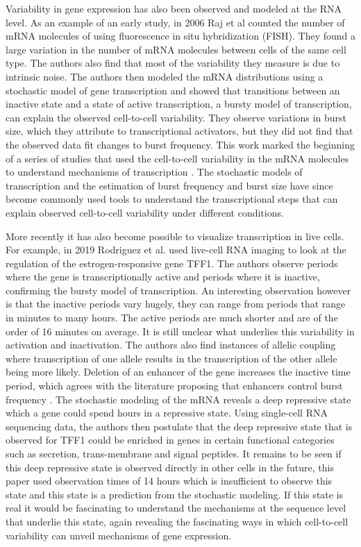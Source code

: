 Variability in gene expression has also been observed and modeled at the RNA level. As an example of an early study, in 2006 Raj et al \cite{raj2006pb} counted the number of mRNA molecules of using fluorescence in situ hybridization (FISH). They found a large variation in the number of mRNA molecules between cells of the same cell type. The authors also find that most of the variability they measure is due to intrinsic noise. The authors then modeled the mRNA distributions using a stochastic model of gene transcription and showed that transitions between an inactive state and a state of active transcription, a bursty model of transcription, can explain the observed cell-to-cell variability. They observe variations in burst size, which they attribute to transcriptional activators, but they did not find that the observed data fit changes to burst frequency. This work marked the beginning of a series of studies that used the cell-to-cell variability in the mRNA molecules to understand mechanisms of transcription \cite{symmons2016mc} \cite{chen2018tissues}. The stochastic models of transcription and the estimation of burst frequency and burst size have since become commonly used tools to understand the transcriptional steps that can explain observed cell-to-cell variability under different conditions.

More recently it has also become possible to visualize transcription in live cells. For example, in 2019 Rodriguez et al. \cite{rodriguez_intrinsic_2019} used live-cell RNA imaging to look at the regulation of the estrogen-responsive gene TFF1. The authors observe periods where the gene is transcriptionally active and periods where it is inactive, confirming the bursty model of transcription. An interesting observation however is that the inactive periods vary hugely, they can range from periods that range in minutes to many hours. The active periods are much  shorter and are of the order of 16 minutes on average. It is still unclear what underlies this variability in activation and inactivation. The authors also find instances of allelic coupling where transcription of one allele results in the transcription of the other allele being more likely. Deletion of an enhancer of the gene increases the inactive time period, which agrees with the literature proposing that enhancers control burst frequency \cite{larsson2019n}. The stochastic modeling of the mRNA reveals a deep repressive state  which a gene could spend hours in a repressive state. Using single-cell RNA sequencing data, the authors then postulate that the deep repressive state that is observed for TFF1 could be enriched in genes in certain functional categories such as secretion, trans-membrane and signal peptides. It remains to be seen if this deep repressive state is observed directly in other cells in the future, this paper used observation times of 14 hours which is insufficient to observe this state and this state is a prediction from the stochastic modeling. If this state is real it would be fascinating to understand the mechanisms at the sequence level that underlie this state, again revealing the fascinating ways in which cell-to-cell variability can unveil mechanisms of gene expression.

